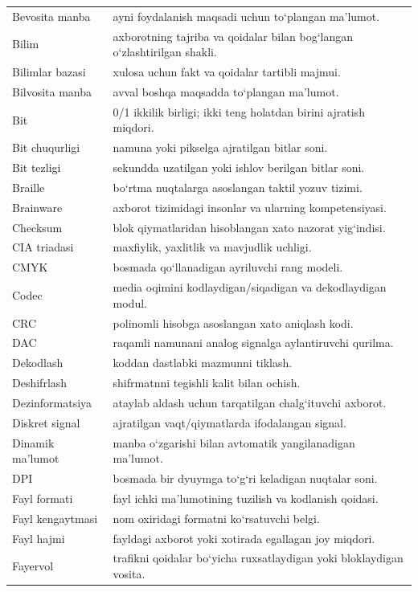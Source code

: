 \documentclass[11pt,a4paper,oneside]{book}
\begin{document}
\begin{longtable}{@{}L{38mm}L{127mm}@{}}
Bevosita manba & ayni foydalanish maqsadi uchun to‘plangan ma’lumot.\\
Bilim & axborotning tajriba va qoidalar bilan bog‘langan o‘zlashtirilgan shakli.\\
Bilimlar bazasi & xulosa uchun fakt va qoidalar tartibli majmui.\\
Bilvosita manba & avval boshqa maqsadda to‘plangan ma’lumot.\\
Bit & 0/1 ikkilik birligi; ikki teng holatdan birini ajratish miqdori.\\
Bit chuqurligi & namuna yoki pikselga ajratilgan bitlar soni.\\
Bit tezligi & sekundda uzatilgan yoki ishlov berilgan bitlar soni.\\
Braille & bo‘rtma nuqtalarga asoslangan taktil yozuv tizimi.\\
Brainware & axborot tizimidagi insonlar va ularning kompetensiyasi.\\
Checksum & blok qiymatlaridan hisoblangan xato nazorat yig‘indisi.\\
CIA triadasi & maxfiylik, yaxlitlik va mavjudlik uchligi.\\
CMYK & bosmada qo‘llanadigan ayriluvchi rang modeli.\\
Codec & media oqimini kodlaydigan/siqadigan va dekodlaydigan modul.\\
CRC & polinomli hisobga asoslangan xato aniqlash kodi.\\
DAC & raqamli namunani analog signalga aylantiruvchi qurilma.\\
Dekodlash & koddan dastlabki mazmunni tiklash.\\
Deshifrlash & shifrmatnni tegishli kalit bilan ochish.\\
Dezinformatsiya & ataylab aldash uchun tarqatilgan chalg‘ituvchi axborot.\\
Diskret signal & ajratilgan vaqt/qiymatlarda ifodalangan signal.\\
Dinamik ma’lumot & manba o‘zgarishi bilan avtomatik yangilanadigan ma’lumot.\\
DPI & bosmada bir dyuymga to‘g‘ri keladigan nuqtalar soni.\\
Fayl formati & fayl ichki ma’lumotining tuzilish va kodlanish qoidasi.\\
Fayl kengaytmasi & nom oxiridagi formatni ko‘rsatuvchi belgi.\\
Fayl hajmi & fayldagi axborot yoki xotirada egallagan joy miqdori.\\
Fayervol & trafikni qoidalar bo‘yicha ruxsatlaydigan yoki bloklaydigan vosita.\\

\end{longtable}
\end{document}

